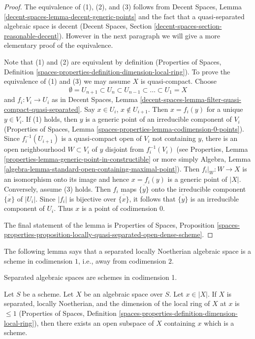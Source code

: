 \begin{proof}
The equivalence of (1), (2), and (3) follows from
Decent Spaces, Lemma \ref{decent-spaces-lemma-decent-generic-points}
and the fact that a quasi-separated algebraic space is decent
(Decent Spaces, Section \ref{decent-spaces-section-reasonable-decent}).
However in the next paragraph we will give a more elementary proof of the
equivalence.

\medskip\noindent
Note that (1) and (2) are equivalent by definition
(Properties of Spaces, Definition
\ref{spaces-properties-definition-dimension-local-ring}).
To prove the equivalence of (1) and (3) we may assume $X$ is quasi-compact.
Choose
$$
\emptyset = U_{n + 1} \subset
U_n \subset U_{n - 1} \subset \ldots \subset U_1 = X
$$
and $f_i : V_i \to U_i$ as in Decent Spaces, Lemma
\ref{decent-spaces-lemma-filter-quasi-compact-quasi-separated}.
Say $x \in U_i$, $x \not \in U_{i + 1}$. Then $x = f_i(y)$ for
a unique $y \in V_i$. If (1) holds, then $y$ is a generic point of
an irreducible component of $V_i$ (Properties of Spaces, Lemma
\ref{spaces-properties-lemma-codimension-0-points}).
Since $f_i^{-1}(U_{i + 1})$ is a quasi-compact open of $V_i$
not containing $y$, there is an open neighbourhood $W \subset V_i$
of $y$ disjoint from $f_i^{-1}(V_i)$
(see
Properties, Lemma \ref{properties-lemma-generic-point-in-constructible}
or more simply Algebra, Lemma
\ref{algebra-lemma-standard-open-containing-maximal-point}).
Then $f_i|_W : W \to X$ is an isomorphism onto its image and hence
$x = f_i(y)$ is a generic point of $|X|$. Conversely, assume (3) holds.
Then $f_i$ maps $\overline{\{y\}}$ onto the irreducible component
$\overline{\{x\}}$ of $|U_i|$. Since $|f_i|$ is bijective over
$\overline{\{x\}}$, it follows that $\overline{\{y\}}$
is an irreducible component of $U_i$. Thus $x$ is a point of
codimension $0$.

\medskip\noindent
The final statement of the lemma is
Properties of Spaces, Proposition
\ref{spaces-properties-proposition-locally-quasi-separated-open-dense-scheme}.
\end{proof}

\noindent
The following lemma says that a separated locally Noetherian algebraic
space is a scheme in codimension $1$, i.e., away from codimension $2$.

\begin{lemma}
\label{lemma-codim-1-point-in-schematic-locus}
\begin{slogan}
Separated algebraic spaces are schemes in codimension 1.
\end{slogan}
Let $S$ be a scheme. Let $X$ be an algebraic space over $S$.
Let $x \in |X|$. If $X$ is separated, locally Noetherian, and
the dimension of the local ring of $X$ at $x$ is $\leq 1$
(Properties of Spaces, Definition
\ref{spaces-properties-definition-dimension-local-ring}),
then there exists an open subspace of $X$ containing $x$ which is a scheme.
\end{lemma}

